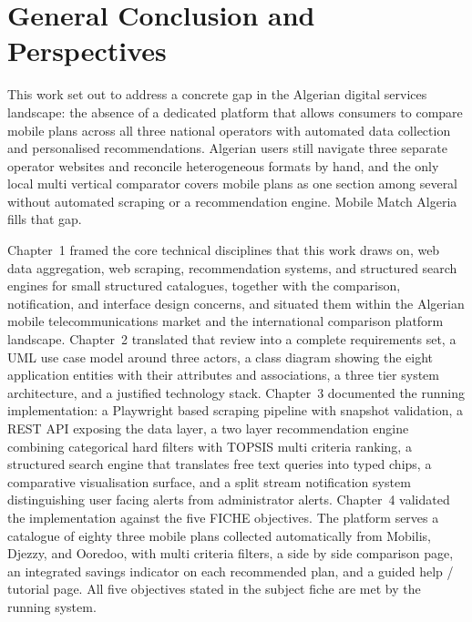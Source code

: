 
\chapter*{General Conclusion and Perspectives}

This work set out to address a concrete gap in the Algerian digital services landscape: the absence of a dedicated platform that allows consumers to compare mobile plans across all three national operators with automated data collection and personalised recommendations. Algerian users still navigate three separate operator websites and reconcile heterogeneous formats by hand, and the only local multi vertical comparator covers mobile plans as one section among several without automated scraping or a recommendation engine. Mobile Match Algeria fills that gap.

Chapter~1 framed the core technical disciplines that this work draws on, web data aggregation, web scraping, recommendation systems, and structured search engines for small structured catalogues, together with the comparison, notification, and interface design concerns, and situated them within the Algerian mobile telecommunications market and the international comparison platform landscape. Chapter~2 translated that review into a complete requirements set, a UML use case model around three actors, a class diagram showing the eight application entities with their attributes and associations, a three tier system architecture, and a justified technology stack. Chapter~3 documented the running implementation: a Playwright based scraping pipeline with snapshot validation, a REST API exposing the data layer, a two layer recommendation engine combining categorical hard filters with TOPSIS multi criteria ranking, a structured search engine that translates free text queries into typed chips, a comparative visualisation surface, and a split stream notification system distinguishing user facing alerts from administrator alerts. Chapter~4 validated the implementation against the five FICHE objectives. The platform serves a catalogue of eighty three mobile plans collected automatically from Mobilis, Djezzy, and Ooredoo, with multi criteria filters, a side by side comparison page, an integrated savings indicator on each recommended plan, and a guided help / tutorial page. All five objectives stated in the subject fiche are met by the running system.

